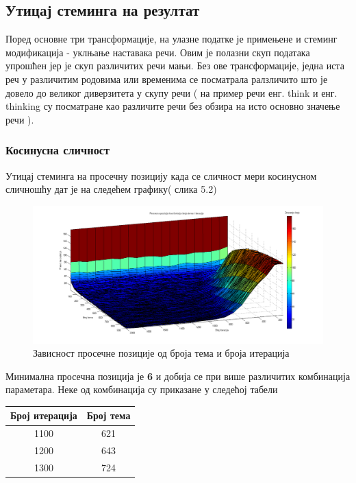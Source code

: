 \subsection{Утицај стеминга на резултат}

Поред основне три трансформације, на улазне податке је примењене и стеминг модификација - уклњање наставака речи. Овим је полазни скуп података упрошћен јер је скуп различитих речи мањи. Без ове трансформације, једна иста реч у различитим родовима или временима се посматрала ралзличито што је довело до великог диверзитета у скупу речи ( на пример речи енг. think и енг. thinking су посматране као различите речи без обзира на исто основно значење речи ). 

\subsubsection{Косинусна сличност}



Утицај стеминга на просечну позицију  када се сличност мери косинусном сличношћу дат је на следећем графику( слика 5.2)

		\begin{figure}[H]
    \centering
   \includegraphics[scale=0.3]{./Slike/StemNoSyn.png} 
	\caption{Зависност просечне позиције од броја тема и броја итерација}
	\label{fig:slika1}
\end{figure}

Минимална просечна позиција је \textbf{6} и добија се при више различитих комбинација параметара. Неке од комбинација су приказане у следећој табели

\begin{center}
\begin{tabular}{|c|c|}
\hline
Број итерација & Број тема \\
\hline\hline
1100 & 621 \\
1200 & 643 \\
1300 & 724 \\
\hline
\end{tabular}
\end{center}

